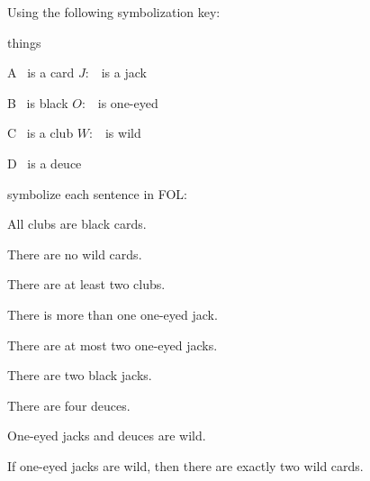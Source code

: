 \problempart
\label{pr.FOLcards}
Using the following symbolization key:
\begin{ekey}
\item[\text{domain}] things
\item[A] \blank\ is a card \hspace{2em} $J:$ \blank\  is a jack
\item[B] \blank\  is black \hspace{2em} $O:$ \blank\  is one-eyed
\item[C] \blank\  is a club \hspace{2em} $W:$ \blank\  is wild
\item[D] \blank\  is a deuce
\end{ekey}
symbolize each sentence in FOL:
\begin{earg}
\item All clubs are black cards.
\item There are no wild cards.
\item There are at least two clubs.
\item There is more than one one-eyed jack.
\item There are at most two one-eyed jacks.
\item There are two black jacks.
\item There are four deuces.
\item One-eyed jacks and deuces are wild.
\item If one-eyed jacks are wild, then there are exactly two wild cards.
\end{earg}


